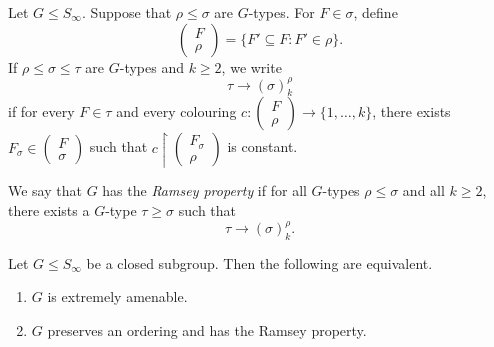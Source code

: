 \begin{definition}
    \label{def:group-ramsey-property}
    Let \(G\leq S_\infty\). Suppose that \(\rho\leq \sigma\) are \(G\)-types. For \(F\in \sigma\), define
    \[
        \begin{pmatrix} F \\ \rho \end{pmatrix}
        =
        \{F'\subseteq F : F'\in \rho\}.
    \]
    If \(\rho\leq \sigma\leq \tau\) are \(G\)-types and \(k\geq 2\), we write
    \[
        \tau \to (\sigma)^\rho_k
    \]
    if for every \(F\in\tau\) and every colouring
    \(c\colon \begin{pmatrix} F \\ \rho \end{pmatrix}\to\{1,\dots,k\}\), there exists
    \(F_\sigma\in \begin{pmatrix} F \\ \sigma \end{pmatrix}\) such that
    \(c\restriction \begin{pmatrix} F_\sigma \\ \rho \end{pmatrix}\) is constant.

    We say that \(G\) has the \emph{Ramsey property} if for all \(G\)-types \(\rho\leq \sigma\) and all \(k\geq 2\), there exists a \(G\)-type \(\tau\geq \sigma\) such that
    \[
        \tau \to (\sigma)^\rho_k.
    \]
\end{definition}

\begin{theorem}
    \label{thm:ea-iff-ordering-plus-group-ramsey}
    Let \(G\leq S_\infty\) be a closed subgroup. Then the following are equivalent.
    \begin{enumerate}
        \item[(i)] \(G\) is extremely amenable.
        \item[(ii)] \(G\) preserves an ordering and has the Ramsey property.
    \end{enumerate}
\end{theorem}

